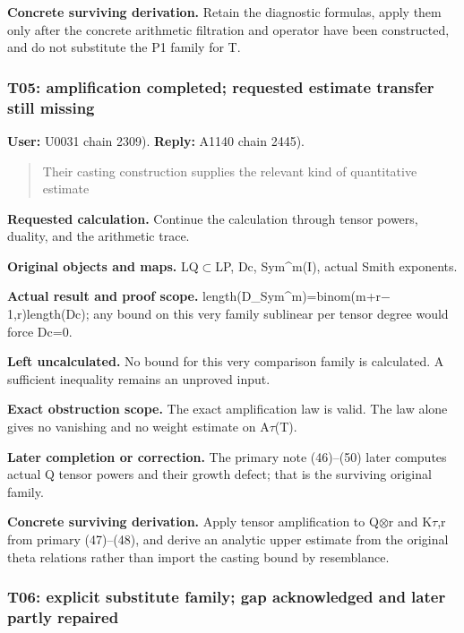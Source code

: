 \documentclass[10pt,a4paper,oneside]{report}
\begin{document}
\textbf{Concrete surviving derivation.} Retain the diagnostic formulas,
apply them only after the concrete arithmetic filtration and operator
have been constructed, and do not substitute the P1 family for T.

\subsubsection{T05: amplification completed; requested estimate transfer
still
missing}\label{t05-amplification-completed-requested-estimate-transfer-still-missing}

\textbf{User:} U0031
\protect{} chain 2309).
\textbf{Reply:} A1140
\protect{} chain 2445).

\begin{quote}
Their casting construction supplies the relevant kind of quantitative
estimate
\end{quote}

\textbf{Requested calculation.} Continue the calculation through tensor
powers, duality, and the arithmetic trace.

\textbf{Original objects and maps.}
LQ\allowbreak{}\ensuremath{⊂}\allowbreak{}LP, Dc, Sym\^{}m(I), actual
Smith exponents.

\textbf{Actual result and proof scope.}
length(D\_Sym\textasciicircum{}m)=binom(m+r\allowbreak{}\ensuremath{−}\allowbreak{}1,r)length(Dc);
any bound on this very family sublinear per tensor degree would force
Dc=0.

\textbf{Left uncalculated.} No bound for this very comparison family is
calculated. A sufficient inequality remains an unproved input.

\textbf{Exact obstruction scope.} The exact amplification law is valid.
The law alone gives no vanishing and no weight estimate on
A\allowbreak{}\ensuremath{τ}\allowbreak{}(T).

\textbf{Later completion or correction.} The primary note (46)--(50)
later computes actual Q tensor powers and their growth defect; that is
the surviving original family.

\textbf{Concrete surviving derivation.} Apply tensor amplification to
Q\allowbreak{}\ensuremath{⊗}\allowbreak{}r and
K\allowbreak{}\ensuremath{τ}\allowbreak{},r from primary (47)--(48), and
derive an analytic upper estimate from the original theta relations
rather than import the casting bound by resemblance.

\subsubsection{T06: explicit substitute family; gap acknowledged and
later partly
repaired}\label{t06-explicit-substitute-family-gap-acknowledged-and-later-partly-repaired}
\end{document}
